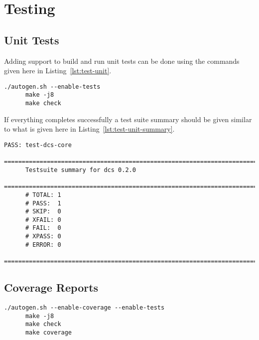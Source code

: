 \section{Testing}\label{sec:test}

  \subsection{Unit Tests}\label{sec:test-unit}

    Adding support to build and run unit tests can be done using the commands given here
    in Listing~\ref{lst:test-unit}.

    \begin{lstlisting}[caption={Compiling and Running Unit Tests},label={lst:test-unit}]
      ./autogen.sh --enable-tests
      make -j8
      make check
    \end{lstlisting}

    If everything completes successfully a test suite summary should be given similar to
    what is given here in Listing~\ref{lst:test-unit-summary}.

    \begin{lstlisting}[caption={Test Suite Summary},label={lst:test-unit-summary}]
      PASS: test-dcs-core
      ============================================================================
      Testsuite summary for dcs 0.2.0
      ============================================================================
      # TOTAL: 1
      # PASS:  1
      # SKIP:  0
      # XFAIL: 0
      # FAIL:  0
      # XPASS: 0
      # ERROR: 0
      ============================================================================
    \end{lstlisting}

  \subsection{Coverage Reports}\label{sec:test-cov}

    \begin{lstlisting}[caption={Generating Coverage Reports},label={lst:test-cov}]
      ./autogen.sh --enable-coverage --enable-tests
      make -j8
      make check
      make coverage
    \end{lstlisting}

